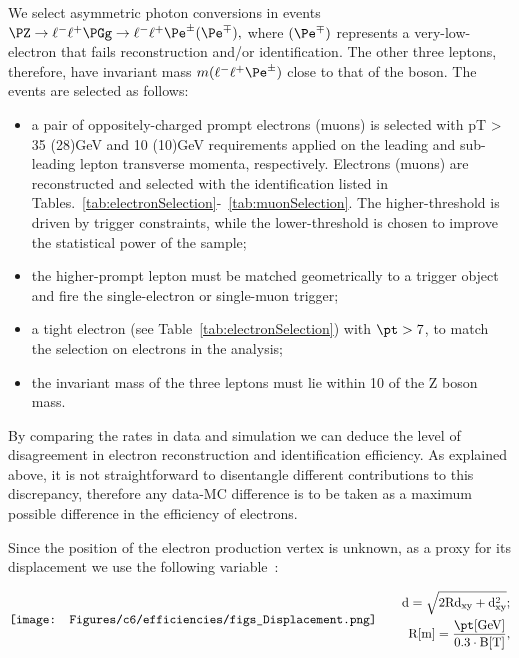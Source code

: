 We select asymmetric photon conversions in events
\(\PZ\to\ell^-\ell^+\PGg\to\ell^-\ell^+\Pe^\pm(\Pe^\mp),\)
where $(\Pe^\mp)$ represents a very-low-\pt electron that fails
reconstruction and/or identification. The other three leptons,
therefore, have invariant mass
\(m(\ell^-\ell^+\Pe^\pm)\)
close to that of the \PZ boson.
The events are selected as follows:
\begin{itemize}
\setlength\itemsep{-0.2em}
\item a pair of oppositely-charged prompt electrons (muons) is selected with pT > 35 (28)GeV and
10 (10)GeV requirements applied on the leading and sub-leading lepton transverse momenta,
 respectively. Electrons (muons) are reconstructed and selected with
 the identification listed in Tables.~\ref{tab:electronSelection}-~\ref{tab:muonSelection}.
  The higher-\pt threshold is driven by trigger constraints, while the
  lower-\pt threshold is chosen to improve the statistical power of
  the sample; 
\item the higher-\pt prompt lepton must be matched geometrically to a
  trigger object and fire the single-electron or single-muon trigger;
\item a \displ tight electron (see
  Table~\ref{tab:electronSelection}) with $\pt>7$\GeV, to match the
  selection on \displ electrons in the analysis;
\item the invariant mass of the three leptons must lie within 10\GeV
  of the Z boson mass.
\end{itemize}
By comparing the rates in data and simulation we can deduce the level
of disagreement in \displ electron reconstruction and
identification efficiency.
As explained above, it is not straightforward to disentangle different
contributions to this discrepancy, therefore any data-MC difference is
to be taken as a maximum possible difference in the efficiency of
\displ electrons.

Since the position of the \displ electron production vertex is
unknown, as a proxy for its displacement we use the following
variable~\cite{convz}:

\begin{align}
\vcenter{\hbox{\texttt{[image: Figures/c6/efficiencies/figs\_Displacement.png]}}}
&\qquad
\begin{aligned}
\mathrm{d = \sqrt{2Rd_{xy}+d_{xy}^2}};
\\
\mathrm{R [m] = \frac{\pt [GeV]}{0.3 \cdot B [T]}},
\end{aligned}\\
\vcenter{\hbox{\begin{minipage}{4cm}
\end{minipage}}}
& \notag
\end{align}

